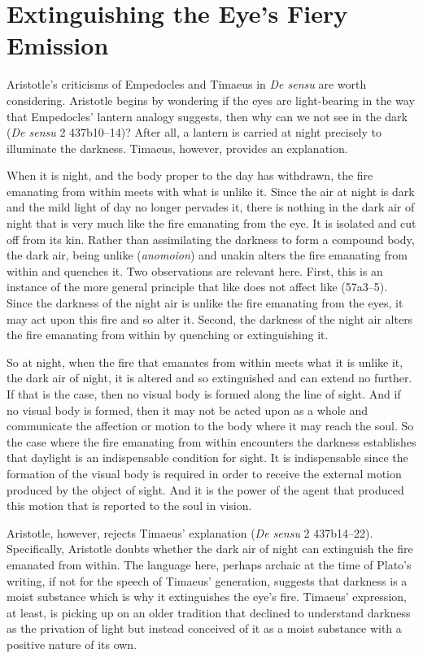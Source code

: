 
\section{Extinguishing the Eye's Fiery Emission} %
\label{sec:the_quenching_of_the_eye_s_fire}

Aristotle's criticisms of Empedocles and Timaeus in \emph{De sensu} are worth considering. Aristotle begins by wondering if the eyes are light-bearing in the way that Empedocles' lantern analogy suggests, then why can we not see in the dark (\emph{De sensu} 2 437b10--14)? After all, a lantern is carried at night precisely to illuminate the darkness. Timaeus, however, provides an explanation.

When it is night, and the body proper to the day has withdrawn, the fire emanating from within meets with what is unlike it. Since the air at night is dark and the mild light of day no longer pervades it, there is nothing in the dark air of night that is very much like the fire emanating from the eye. It is isolated and cut off from its kin. Rather than assimilating the darkness to form a compound body, the dark air, being unlike (\emph{anomoion}) and unakin alters the fire emanating from within and quenches it. Two observations are relevant here. First, this is an instance of the more general principle that like does not affect like (57a3--5). Since the darkness of the night air is unlike the fire emanating from the eyes, it may act upon this fire and so alter it. Second, the darkness of the night air alters the fire emanating from within by quenching or extinguishing it.

So at night, when the fire that emanates from within meets what it is unlike it, the dark air of night, it is altered and so extinguished and can extend no further. If that is the case, then no visual body is formed along the line of sight. And if no visual body is formed, then it may not be acted upon as a whole and communicate the affection or motion to the body where it may reach the soul. So the case where the fire emanating from within encounters the darkness establishes that daylight is an indispensable condition for sight. It is indispensable since the formation of the visual body is required in order to receive the external motion produced by the object of sight. And it is the power of the agent that produced this motion that is reported to the soul in vision.

Aristotle, however, rejects Timaeus' explanation (\emph{De sensu} 2 437b14--22). Specifically, Aristotle doubts whe\-ther the dark air of night can extinguish the fire emanated from within. The language here, perhaps archaic at the time of Plato's writing, if not for the speech of Timaeus' generation, suggests that darkness is a moist substance which is why it extinguishes the eye's fire. Timaeus' expression, at least, is picking up on an older tradition that declined to understand darkness as the privation of light but instead conceived of it as a moist substance with a positive nature of its own.

